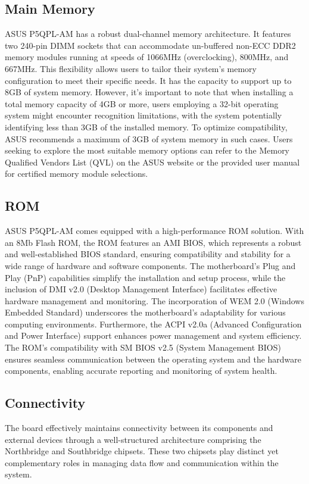 \subsection{Main Memory}
ASUS P5QPL-AM has a robust dual-channel memory architecture. It features two 240-pin DIMM sockets that can accommodate un-buffered non-ECC DDR2 memory modules running at speeds of 1066MHz (overclocking), 800MHz, and 667MHz. This flexibility allows users to tailor their system's memory configuration to meet their specific needs. It has the capacity to support up to 8GB of system memory. However, it's important to note that when installing a total memory capacity of 4GB or more, users employing a 32-bit operating system might encounter recognition limitations, with the system potentially identifying less than 3GB of the installed memory. To optimize compatibility, ASUS recommends a maximum of 3GB of system memory in such cases. Users seeking to explore the most suitable memory options can refer to the Memory Qualified Vendors List (QVL) on the ASUS website or the provided user manual for certified memory module selections.

\subsection{ROM}
ASUS P5QPL-AM comes equipped with a high-performance ROM solution. With an 8Mb Flash ROM, the ROM features an AMI BIOS, which represents a robust and well-established BIOS standard, ensuring compatibility and stability for a wide range of hardware and software components. The motherboard's Plug and Play (PnP) capabilities simplify the installation and setup process, while the inclusion of DMI v2.0 (Desktop Management Interface) facilitates effective hardware management and monitoring. The incorporation of WEM 2.0 (Windows Embedded Standard) underscores the motherboard's adaptability for various computing environments. Furthermore, the ACPI v2.0a (Advanced Configuration and Power Interface) support enhances power management and system efficiency. The ROM's compatibility with SM BIOS v2.5 (System Management BIOS) ensures seamless communication between the operating system and the hardware components, enabling accurate reporting and monitoring of system health.

\subsection{Connectivity}
The board effectively maintains connectivity between its components and external devices through a well-structured architecture comprising the Northbridge and Southbridge chipsets. These two chipsets play distinct yet complementary roles in managing data flow and communication within the system.

